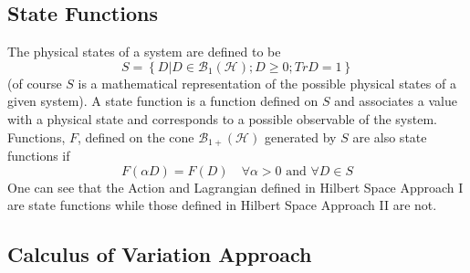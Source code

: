 \documentclass[aps,preprint]{revtex4}
\begin{document}
\subsection{State Functions}

The physical states of a system are defined to be 
\begin{equation}
S=\left\{ D|D\in \mathcal{B}_{1}\left( \mathcal{H}\right) ;D\geq
0;TrD=1\right\}
\end{equation}%
(of course $S$ is a mathematical representation of the possible physical
states of a given system). A state function is a function defined on $S$ and
associates a value with a physical state and corresponds to a possible
observable of the system. Functions, $F$, defined on the cone $\mathcal{B}%
_{1+}\left( \mathcal{H}\right) $ generated by $S$ are also state functions
if 
\begin{equation}
F\left( \alpha D\right) =F\left( D\right) \quad \forall \alpha >0\text{ and }%
\forall D\in S
\end{equation}%
One can see that the Action and Lagrangian defined in Hilbert Space Approach
I are state functions while those defined in Hilbert Space Approach II are
not.

\subsection{Calculus of Variation Approach}
\end{document}

